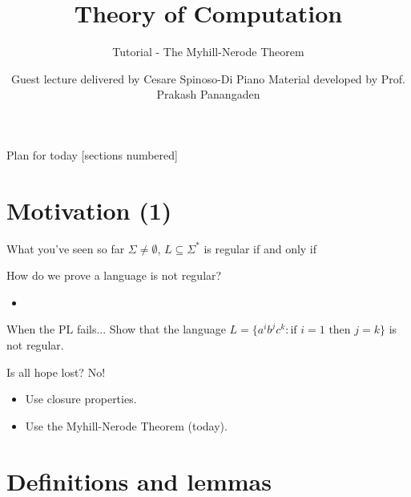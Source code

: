 \documentclass[10pt]{beamer}
\title{Theory of Computation}
\subtitle{Tutorial - The Myhill-Nerode Theorem}
\date{}
\author{Guest lecture delivered by Cesare Spinoso-Di Piano \newline Material developed by Prof. Prakash Panangaden}
\begin{document}
\maketitle

\begin{frame}{Plan for today}
    [sections numbered]
    \tableofcontents[hideallsubsections]
\end{frame}

\section{Motivation (1)}

\begin{frame}[t]{What you've seen so far}
    $\Sigma \neq \emptyset$, $L \subseteq \Sigma^*$ is regular if and only if

\end{frame}

\begin{frame}{How do we prove a language is not regular?}
    \begin{itemize}
        \item
    \end{itemize}
\end{frame}

\begin{frame}[t]{When the PL fails...}
    Show that the language $L = \{a^ib^jc^k : \text{if } i = 1 \text{ then } j = k\}$ is not regular.
\end{frame}

\begin{frame}[t]{Is all hope lost?}
    No!
    \begin{itemize}
        \setlength\itemsep{7em}
        \item Use closure properties.
        \item Use the Myhill-Nerode Theorem (today).
    \end{itemize}
\end{frame}

\section{Definitions and lemmas}
\end{document}
